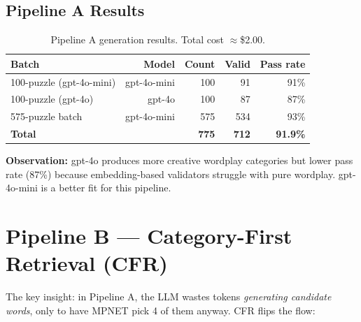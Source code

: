 \documentclass[11pt, letterpaper]{article}
\begin{document}
\subsection*{Pipeline A Results}

\begin{table}[H]
\centering
\small
\begin{tabular}{lrrrr}
\toprule
\textbf{Batch} & \textbf{Model} & \textbf{Count} & \textbf{Valid} & \textbf{Pass rate} \\
\midrule
100-puzzle (gpt-4o-mini) & gpt-4o-mini & 100 & 91 & 91\% \\
100-puzzle (gpt-4o)      & gpt-4o      & 100 & 87 & 87\% \\
575-puzzle batch         & gpt-4o-mini & 575 & 534 & 93\% \\
\midrule
\textbf{Total}           &             & \textbf{775} & \textbf{712} & \textbf{91.9\%} \\
\bottomrule
\end{tabular}
\caption{Pipeline A generation results. Total cost $\approx$\$2.00.}
\end{table}

\textbf{Observation:} gpt-4o produces more creative wordplay categories but lower
pass rate (87\%) because embedding-based validators struggle with pure wordplay.
gpt-4o-mini is a better fit for this pipeline.

\section{Pipeline B --- Category-First Retrieval (CFR)}

The key insight: in Pipeline A, the LLM wastes tokens \emph{generating candidate
words}, only to have MPNET pick 4 of them anyway. CFR flips the flow:
\end{document}
